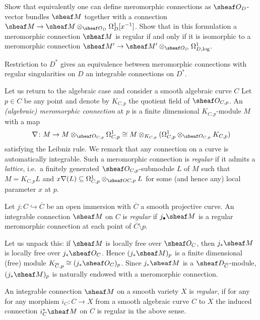 \documentclass[number-in-sections,a4paper]{notes}
\begin{document}
\begin{Exercise}
    Show that equivalently one can define meromorphic connections as $\sO_D$-vector bundles $\sheaf M$ together with a connection $\sheaf M \to \sheaf M \otimes_{\sO_D} \ctb{D}[x^{-1}]$.
    Show that in this formulation a meromorphic connection $\sheaf M$ is regular if and only if it is isomorphic to a meromorphic connection $\sheaf M' \to \sheaf M' \otimes_{\sO_D} \ctb{D,\log}$.
\end{Exercise}

\begin{Theorem}
    Restriction to $D^*$ gives an equivalence between meromorphic connections with regular singularities on $D$ an integrable connections on $D^*$.
\end{Theorem}

Let us return to the algebraic case and consider a smooth algebraic curve $C$
Let $p  \in C$ be any point and denote by $K_{C,p}$ the quotient field of $\sO_{C,p}$.
An \emph{(algebraic) meromorphic connection} at $p$ is a finite dimensional $K_{C,p}$-module $M$ with a map
\[
    \nabla \colon M \to M \otimes_{\sO_{C,p}} \ctb{C,p} \cong M \otimes_{K_{C,p}} (\ctb{C,p} \otimes_{\sO_{C,p}} K_{C,p})
\]
satisfying the Leibniz rule.
We remark that any connection on a curve is automatically integrable.
Such a meromorphic connection is \emph{regular} if it admits a \emph{lattice}, i.e.~a finitely generated $\sO_{C,p}$-submodule $L$ of $M$ such that $M = K_{C,p}L$ and $x\nabla(L) \subseteq \ctb{C,p} \otimes_{\sO{C,p}} L$ for some (and hence any) local parameter $x$ at $p$.

\begin{Definition}
    Let $j\colon C \hookrightarrow \overline C$ be an open immersion with $\overline C$ a smooth projective curve.
    An integrable connection $\sheaf M$ on $C$ is \emph{regular} if $j_\bullet \sheaf M$ is a regular meromorphic connection at each point of $\overline C \setminus p$.
\end{Definition}

Let us unpack this: if $\sheaf M$ is locally free over $\sO_C$, then $j_*\sheaf M$ is locally free over $j_*\sO_C$.
Hence $(j_*\sheaf M)_p$ is a finite dimensional (free) module $K_{\overline C,p} \cong (j_*\sO_C)_p$.
Since $j_*\sheaf M$ is a $\sD_{\overline C}$-module, $(j_*\sheaf M)_p$ is naturally endowed with a meromorphic connection.

\begin{Definition}
    An integrable connection $\sheaf M$ on a smooth variety $X$ is \emph{regular}, if for any for any morphism $i_C\colon C \to X$ from a smooth algebraic curve $C$ to $X$ the induced connection $i_C^*\sheaf M$ on $C$ is regular in the above sense.
\end{Definition}
\end{document}
